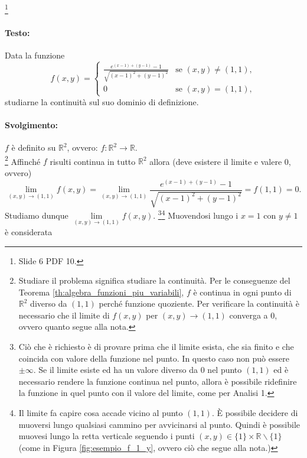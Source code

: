 \begin{example}\footnote{Slide 6 PDF 10.}
    \paragraph{Testo:} Data la funzione
    \begin{equation*}
        f(x,y)=
        \begin{cases}
            \frac{e^{(x-1)+(y-1)}-1}{\sqrt{(x-1)^2+(y-1)^2}} &\text{se } (x,y)\neq (1,1),\\
            0 &\text{se } (x,y)=(1,1),
        \end{cases}
    \end{equation*}
    studiarne la continuità sul suo dominio di definizione.
    \paragraph{Svolgimento:} $f$ è definito su $\mathbb R^2$, ovvero: $f\colon\mathbb R^2\rightarrow\mathbb R$.\\
    \footnote{Studiare il problema significa studiare la continuità. Per le conseguenze del Teorema \ref{th:algebra_funzioni_piu_variabili}, $f$ è continua in ogni punto di $\mathbb R^2$ diverso da $(1,1)$ perché funzione quoziente. Per verificare la continuità è necessario che il limite di $f(x,y)$ per $(x,y)\rightarrow (1,1)$ converga a 0, ovvero quanto segue alla nota.} Affinché $f$ risulti continua in tutto $\mathbb R^2$ allora (deve esistere il limite e valere 0, ovvero)
    \begin{equation*}
        \lim\limits_{(x,y)\rightarrow(1,1)} f(x,y)=\lim\limits_{(x,y)\rightarrow(1,1)}\frac{e^{(x-1)+(y-1)}-1}{\sqrt{(x-1)^2+(y-1)^2}}=f(1,1)=0.
    \end{equation*}
    Studiamo dunque $\lim\limits_{(x,y)\rightarrow(1,1)}f(x,y)$. \footnote{Ciò che è richiesto è di provare prima che il limite esista, che sia finito e che coincida con valore della funzione nel punto. In questo caso non può essere $\pm\infty$. Se il limite esiste ed ha un valore diverso da 0 nel punto $(1,1)$ ed è necessario rendere la funzione continua nel punto, allora è possibile ridefinire la funzione in quel punto con il valore del limite, come per Analisi 1.}\footnote{Il limite fa capire cosa accade vicino al punto $(1,1)$. È possibile decidere di muoversi lungo qualsiasi cammino per avvicinarsi al punto. Quindi è possibile muovesi lungo la retta verticale seguendo i punti $(x,y)\in\{1\}\times\mathbb R\backslash\{1\}$ (come in Figura \ref{fig:esempio_f_1_y}, ovvero ciò che segue alla nota.)} Muovendosi lungo i $x=1$ con $y\neq 1$ è considerata

\end{example}

